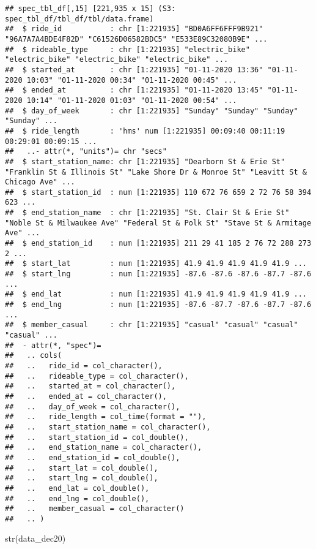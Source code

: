 \documentclass[
]{article}
\newenvironment{Shaded}{\begin{snugshade}}{\end{snugshade}}
\newcommand{\FunctionTok}[1]{\textcolor[rgb]{0.00,0.00,0.00}{#1}}
\newcommand{\NormalTok}[1]{#1}
\begin{document}
\begin{verbatim}
## spec_tbl_df[,15] [221,935 x 15] (S3: spec_tbl_df/tbl_df/tbl/data.frame)
##  $ ride_id           : chr [1:221935] "BD0A6FF6FFF9B921" "96A7A7A4BDE4F82D" "C61526D06582BDC5" "E533E89C32080B9E" ...
##  $ rideable_type     : chr [1:221935] "electric_bike" "electric_bike" "electric_bike" "electric_bike" ...
##  $ started_at        : chr [1:221935] "01-11-2020 13:36" "01-11-2020 10:03" "01-11-2020 00:34" "01-11-2020 00:45" ...
##  $ ended_at          : chr [1:221935] "01-11-2020 13:45" "01-11-2020 10:14" "01-11-2020 01:03" "01-11-2020 00:54" ...
##  $ day_of_week       : chr [1:221935] "Sunday" "Sunday" "Sunday" "Sunday" ...
##  $ ride_length       : 'hms' num [1:221935] 00:09:40 00:11:19 00:29:01 00:09:15 ...
##   ..- attr(*, "units")= chr "secs"
##  $ start_station_name: chr [1:221935] "Dearborn St & Erie St" "Franklin St & Illinois St" "Lake Shore Dr & Monroe St" "Leavitt St & Chicago Ave" ...
##  $ start_station_id  : num [1:221935] 110 672 76 659 2 72 76 58 394 623 ...
##  $ end_station_name  : chr [1:221935] "St. Clair St & Erie St" "Noble St & Milwaukee Ave" "Federal St & Polk St" "Stave St & Armitage Ave" ...
##  $ end_station_id    : num [1:221935] 211 29 41 185 2 76 72 288 273 2 ...
##  $ start_lat         : num [1:221935] 41.9 41.9 41.9 41.9 41.9 ...
##  $ start_lng         : num [1:221935] -87.6 -87.6 -87.6 -87.7 -87.6 ...
##  $ end_lat           : num [1:221935] 41.9 41.9 41.9 41.9 41.9 ...
##  $ end_lng           : num [1:221935] -87.6 -87.7 -87.6 -87.7 -87.6 ...
##  $ member_casual     : chr [1:221935] "casual" "casual" "casual" "casual" ...
##  - attr(*, "spec")=
##   .. cols(
##   ..   ride_id = col_character(),
##   ..   rideable_type = col_character(),
##   ..   started_at = col_character(),
##   ..   ended_at = col_character(),
##   ..   day_of_week = col_character(),
##   ..   ride_length = col_time(format = ""),
##   ..   start_station_name = col_character(),
##   ..   start_station_id = col_double(),
##   ..   end_station_name = col_character(),
##   ..   end_station_id = col_double(),
##   ..   start_lat = col_double(),
##   ..   start_lng = col_double(),
##   ..   end_lat = col_double(),
##   ..   end_lng = col_double(),
##   ..   member_casual = col_character()
##   .. )
\end{verbatim}

\begin{Shaded}
\begin{Highlighting}[]
\FunctionTok{str}\NormalTok{(data\_dec20)}
\end{Highlighting}
\end{Shaded}
\end{document}
